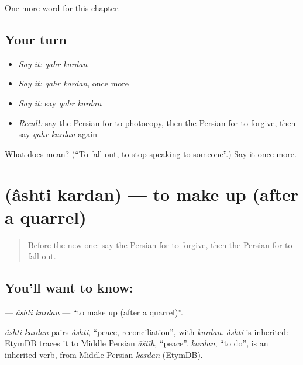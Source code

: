 \begin{grammarlens}[title={What you've built}]
One more word for this chapter.
\end{grammarlens}

\subsection*{Your turn}
\begin{itemize}
\raggedright
  \item \emph{Say it:} \emph{qahr kardan}
  \item \emph{Say it:} \emph{qahr kardan}, once more
  \item \emph{Say it:} say \emph{qahr kardan}
  \item \emph{Recall:} say the Persian for to photocopy, then the Persian for to forgive, then say \emph{qahr kardan} again
\end{itemize}

\begin{tcolorbox}[breakable,colback=teal!4,colframe=teal!35!black,title={Before you move on}]
What does   mean? (\textquotedblleft{}To fall out, to stop speaking to someone\textquotedblright{}.) Say it once more.
\end{tcolorbox}
\section[\texorpdfstring{\fa{آشتی} \fa{کردن} (âshti kardan)}{آشتی کردن (âshti kardan)}]{  (âshti kardan) — to make up (after a quarrel)}

\label{lesson:FA-C221-ashti-kardan}



\begin{quote}
Before the new one: say the Persian for to forgive, then the Persian for to fall out.
\end{quote}

\subsection*{You'll want to know:  }
\textbf{ } — \emph{âshti kardan} — \textquotedblleft{}to make up (after a quarrel)\textquotedblright{}.

\begin{cousinweb}
\emph{âshti kardan} pairs \emph{âshti}, \textquotedblleft{}peace, reconciliation\textquotedblright{}, with \emph{kardan}. \emph{âshti} is inherited: EtymDB traces it to Middle Persian \emph{āštīh}, \textquotedblleft{}peace\textquotedblright{}. \emph{kardan}, \textquotedblleft{}to do\textquotedblright{}, is an inherited verb, from Middle Persian \emph{kardan} (EtymDB).
\end{cousinweb}

